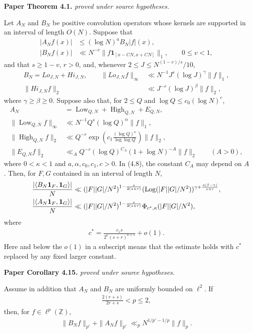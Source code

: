 \begin{theorem}
\label{abstract_improving}
\uses{}
\leanok
\par\medskip\noindent\textbf{Paper Theorem 4.1.} \textit{proved under source hypotheses.}\par
Let $A_N$ and $B_N$ be positive convolution operators whose kernels are
supported in an interval of length $O(N)$.  Suppose that
\begin{align}
 |A_Nf(x)|&\leq(\log N)^aB_N|f|(x),\\
 |B_Nf(x)|&\ll N^{-v}\|f\mathbf1_{[x-CN,x+CN]}\|_1,
 \qquad 0\leq v<1,
\end{align}
and that $s\geq1-v$, $r>0$, and, whenever
$2\leq J\leq N^{(1-v)/s}/10$,
\begin{align}
 B_N=Lo_{J,N}+Hi_{J,N},\qquad
 \|Lo_{J,N}f\|_\infty&\ll N^{-1}J^s(\log J)^\gamma\|f\|_1,
 \\
 \|Hi_{J,N}f\|_2&\ll J^{-r}(\log J)^\beta\|f\|_2,
\end{align}
where $\gamma\geq\beta\geq0$.  Suppose also that, for
$2\leq Q$ and $\log Q\leq c_0(\log N)^c$,
\begin{align}
 A_N&=\operatorname{Low}_{Q,N}+\operatorname{High}_{Q,N}+E_{Q,N},
 \\
 \|\operatorname{Low}_{Q,N}f\|_\infty
 &\ll N^{-1}Q^s(\log Q)^\alpha\|f\|_1,\\
 \|\operatorname{High}_{Q,N}f\|_2
 &\ll Q^{-r}\exp\left(c_1\frac{(\log Q)^\kappa}{\log\log Q}\right)\|f\|_2,
 \\
 \|E_{Q,N}f\|_2&\ll_A Q^{-r}(\log Q)^{C_A}
 (1+\log N)^{-A}\|f\|_2
 \qquad(A>0),
\end{align}
where \(0<\kappa<1\) and \(a,\alpha,c_0,c_1,c>0\).  In
\textup{(4.8)}, the constant \(C_A\) may depend on \(A\).  Then, for
$F,G$ contained in an interval of length $N$,
\begin{align}
 \frac{|\langle B_N\mathbf1_F,\mathbf1_G\rangle|}{N}
 &\ll (|F||G|/N^2)^{1-\frac{s}{2(s+r)}}
 (\operatorname{Log} (|F||G|/N^2))^{\gamma+\frac{s(\beta-\gamma)}{s+r}},\\
 \frac{|\langle A_N\mathbf1_F,\mathbf1_G\rangle|}{N}
 &\ll (|F||G|/N^2)^{1-\frac{s}{2(s+r)}}\Phi_{c^*,\kappa}(|F||G|/N^2),
\end{align}
where 
\begin{align}
 c^*=\frac{c_1s}{2^\kappa(s+r)^{\kappa+1}}+o(1).
\end{align}
Here and below the $o(1)$ in a subscript means that the estimate holds
with $c^*$ replaced by any fixed larger constant.
\par\medskip\noindent\textbf{Paper Corollary 4.15.} \textit{proved under source hypotheses.}\par
Assume in addition that $A_N$ and $B_N$ are uniformly bounded on
$\ell^2$.  If
\begin{align*}
 \frac{2(r+s)}{2r+s}<p\leq2,
\end{align*}
then, for $f\in \ell^p(\mathbb{Z})$,
\begin{align}
 \|B_Nf\|_{p'}+\|A_Nf\|_{p'}
 \ll_p N^{1/p'-1/p}\|f\|_p.
\end{align}
\end{theorem}
